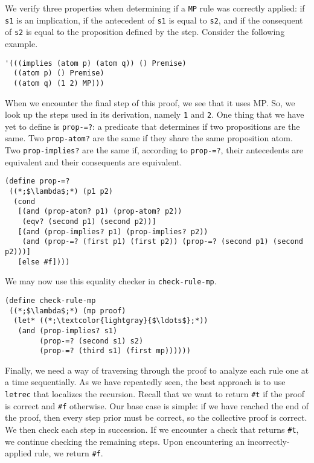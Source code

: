 We verify three properties when determining if a \texttt{MP} rule was correctly applied: if \texttt{s1} is an implication, if the antecedent of \texttt{s1} is equal to \texttt{s2}, and if the consequent of \texttt{s2} is equal to the proposition defined by the step. Consider the following example.

\begin{cl}[]{}\begin{lstlisting}[language=MyScheme]
'(((implies (atom p) (atom q)) () Premise)
  ((atom p) () Premise)
  ((atom q) (1 2) MP)))
\end{lstlisting}\end{cl}

When we encounter the final step of this proof, we see that it uses MP. So, we look up the steps used in its derivation, namely \texttt{1} and \texttt{2}. One thing that we have yet to define is \texttt{prop-=?}: a predicate that determines if two propositions are the same. Two \texttt{prop-atom?} are the same if they share the same proposition atom. Two \texttt{prop-implies?} are the same if, according to \texttt{prop-=?}, their antecedents are equivalent and their consequents are equivalent.

\begin{cl}[]{}\begin{lstlisting}[language=MyScheme]
(define prop-=?
 ((*;$\lambda$;*) (p1 p2)
  (cond
   [(and (prop-atom? p1) (prop-atom? p2)) 
    (eqv? (second p1) (second p2))]
   [(and (prop-implies? p1) (prop-implies? p2)) 
    (and (prop-=? (first p1) (first p2)) (prop-=? (second p1) (second p2)))]
   [else #f])))
\end{lstlisting}\end{cl}

\noindent We may now use this equality checker in \texttt{check-rule-mp}.

\begin{cl}[]{}\begin{lstlisting}[language=MyScheme]
(define check-rule-mp
 ((*;$\lambda$;*) (mp proof)
  (let* ((*;\textcolor{lightgray}{$\ldots$};*))
   (and (prop-implies? s1)
        (prop-=? (second s1) s2)
        (prop-=? (third s1) (first mp))))))
\end{lstlisting}\end{cl}

Finally, we need a way of traversing through the proof to analyze each rule one at a time sequentially. As we have repeatedly seen, the best approach is to use \texttt{letrec} that localizes the recursion. Recall that we want to return \texttt{\#t} if the proof is correct and \texttt{\#f} otherwise. Our base case is simple: if we have reached the end of the proof, then every step prior must be correct, so the collective proof is correct. We then check each step in succession. If we encounter a check that returns \texttt{\#t}, we continue checking the remaining steps. Upon encountering an incorrectly-applied rule, we return \texttt{\#f}. 


